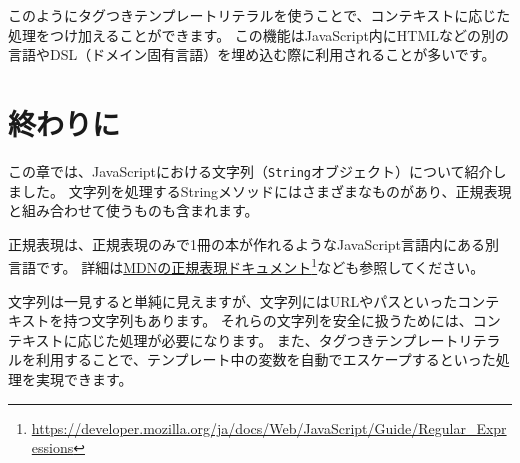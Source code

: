 このようにタグつきテンプレートリテラルを使うことで、コンテキストに応じた処理をつけ加えることができます。
この機能はJavaScript内にHTMLなどの別の言語やDSL（ドメイン固有言語）を埋め込む際に利用されることが多いです。

\hypertarget{string-summary}{%
\section{終わりに}\label{string-summary}}

この章では、JavaScriptにおける文字列（\texttt{String}オブジェクト）について紹介しました。
文字列を処理するStringメソッドにはさまざまなものがあり、正規表現と組み合わせて使うものも含まれます。

正規表現は、正規表現のみで1冊の本が作れるようなJavaScript言語内にある別言語です。
詳細は\href{https://developer.mozilla.org/ja/docs/Web/JavaScript/Guide/Regular_Expressions}{MDNの正規表現ドキュメント}\footnote{\url{https://developer.mozilla.org/ja/docs/Web/JavaScript/Guide/Regular_Expressions}}なども参照してください。

文字列は一見すると単純に見えますが、文字列にはURLやパスといったコンテキストを持つ文字列もあります。
それらの文字列を安全に扱うためには、コンテキストに応じた処理が必要になります。
また、タグつきテンプレートリテラルを利用することで、テンプレート中の変数を自動でエスケープするといった処理を実現できます。
